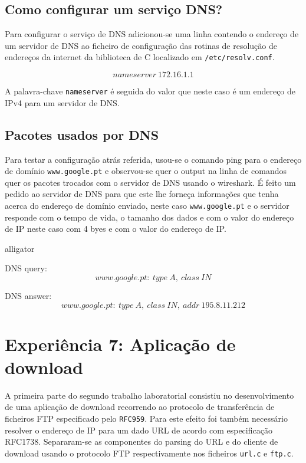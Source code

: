 \documentclass[a4paper,11pt,titlepage]{article}
\begin{document}
\subsection{Como configurar um serviço DNS?}
Para configurar o serviço de DNS adicionou-se uma linha contendo o endereço de um servidor de DNS ao ficheiro de configuração das rotinas de resolução de endereços da internet da biblioteca de C localizado em \texttt{/etc/resolv.conf}.

$$nameserver\ 172.16.1.1$$

A palavra-chave \texttt{nameserver} é seguida do valor que neste caso é um endereço de IPv4 para um servidor de DNS.

\subsection{Pacotes usados por DNS}
Para testar a configuração atrás referida, usou-se o comando ping para o endereço de domínio \texttt{www.google.pt} e observou-se quer o output na linha de comandos quer os pacotes trocados com o servidor de DNS usando o wireshark.
É feito um pedido ao servidor de DNS para que este lhe forneça informações que tenha acerca do endereço de domínio enviado, neste caso \texttt{www.google.pt} e o servidor responde com o tempo de vida, o tamanho dos dados e com o valor do endereço de IP neste caso com 4 byes e com o valor do endereço de IP.

\begin{labeling}{alligator}
\item DNS query:
$$www.google.pt:\ type\ A,\ class\ IN$$

\item DNS answer:
$$www.google.pt:\ type\ A,\ class\ IN,\ addr\ 195.8.11.212$$

\end{labeling}

\section{Experiência 7: Aplicação de download}
A primeira parte do segundo trabalho laboratorial consistiu no desenvolvimento
de uma aplicação de download recorrendo ao protocolo de transferência de
ficheiros FTP especificado pelo \texttt{RFC959}. Para este efeito foi também
necessário resolver o endereço de IP para um dado URL de acordo com
especificação RFC1738. Separaram-se as componentes do parsing do URL e do
cliente de download usando o protocolo FTP respectivamente nos ficheiros
\texttt{url.c} e \texttt{ftp.c}.
\end{document}
